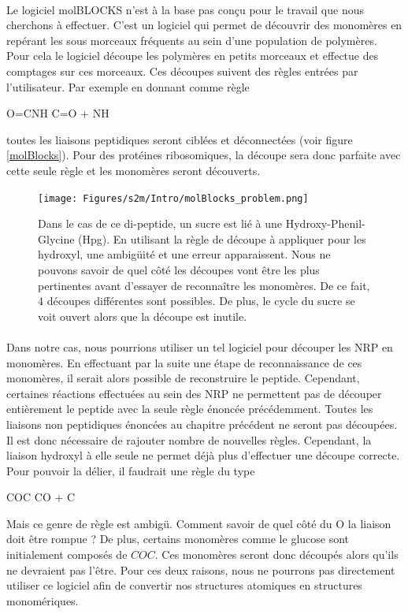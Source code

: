 \documentclass[12pt,french,twoside]{report}
\begin{document}
\paragraph{}Le logiciel molBLOCKS n'est à la base pas conçu pour le travail que nous cherchons à effectuer.
C'est un logiciel qui permet de découvrir des monomères en repérant les sous morceaux fréquents au sein d'une population de polymères.
Pour cela le logiciel découpe les polymères en petits morceaux et effectue des comptages sur ces morceaux.
Ces découpes suivent des règles entrées par l'utilisateur.
Par exemple en donnant comme règle
\begin{chemmath}
  O=CNH \longrightarrow C=O + NH
\end{chemmath}
toutes les liaisons peptidiques seront ciblées et déconnectées (voir figure \ref{molBlocks}).
Pour des protéines ribosomiques, la découpe sera donc parfaite avec cette seule règle et les monomères seront découverts.

\begin{figure}[!h]
  \begin{center}
    \texttt{[image: Figures/s2m/Intro/molBlocks\_problem.png]}
    \caption{\label{molBlocks_problem}Dans le cas de ce di-peptide, un sucre est lié à une Hydroxy-Phenil-Glycine (Hpg).
    En utilisant la règle de découpe à appliquer pour les hydroxyl, une ambigüité et une erreur apparaissent.
    Nous ne pouvons savoir de quel côté les découpes vont être les plus pertinentes avant d'essayer de reconnaître les monomères.
    De ce fait, 4 découpes différentes sont possibles.
    De plus, le cycle du sucre se voit ouvert alors que la découpe est inutile.}
  \end{center}
\end{figure}

\paragraph{}Dans notre cas, nous pourrions utiliser un tel logiciel pour découper les NRP en monomères.
En effectuant par la suite une étape de reconnaissance de ces monomères, il serait alors possible de reconstruire le peptide.
Cependant, certaines réactions effectuées au sein des NRP ne permettent pas de découper entièrement le peptide avec la seule règle énoncée précédemment.
Toutes les liaisons non peptidiques énoncées au chapitre précédent ne seront pas découpées.
Il est donc nécessaire de rajouter nombre de nouvelles règles.
Cependant, la liaison hydroxyl à elle seule ne permet déjà plus d'effectuer une découpe correcte.
Pour pouvoir la délier, il faudrait une règle du type
\begin{chemmath}
  COC \longrightarrow CO + C
\end{chemmath}
Mais ce genre de règle est ambigü.
Comment savoir de quel côté du O la liaison doit être rompue ?
De plus, certains monomères comme le glucose sont initialement composés de $COC$.
Ces monomères seront donc découpés alors qu'ils ne devraient pas l'être.
Pour ces deux raisons, nous ne pourrons pas directement utiliser ce logiciel afin de convertir nos structures atomiques en structures monomériques.
\end{document}
